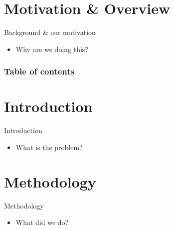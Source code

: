 \documentclass[compress]{beamer}
\title{\presentationtitle}
\subtitle{\presentationsubtitle}
\date{\presentationdate}
\author{\presentingauthor}
\institute{\labname}
\begin{document}
\maketitle

\section*{Motivation \& Overview}

\begin{frame}{Background \& our motivation}
	\begin{itemize}
		\item Why are we doing this? \cite{example}
	\end{itemize}

\end{frame}

\begin{frame}
	\frametitle{Table of contents}
	\tableofcontents
\end{frame}

\section{Introduction}

\begin{frame}{Introduction}
	\begin{itemize}
		\item What is the problem?
	\end{itemize}

\end{frame}

\section{Methodology}

\begin{frame}{Methodology}
	\begin{itemize}
		\item What did we do?
	\end{itemize}

\end{frame}
\end{document}
